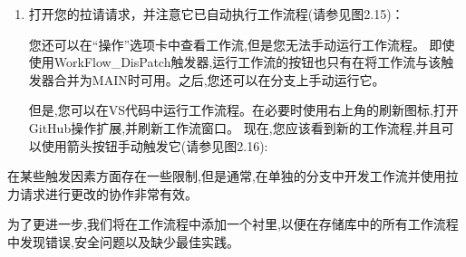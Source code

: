 \begin{enumerate}
\begin{shell}
$ git push -u origin new-workflow
\end{shell}

\item 
接下来,我们将为我们的新分支机构创建拉动请求。当我们使用pull\_request触发器时,这将自动运行我们的新工作流程。转到您的浏览器中的存储库,然后导航以拉出请求。git将检测到您已经推出了一个新分支,并将为您提供创建拉动请求的选项(比较和拉请请求,请参见图2.13):

\myGraphic{0.4}{content/chapter2/images/13.png}{图2.13 --- 在浏览器中创建一个新的pull请求}

只需要保留默认的标题(你之前添加的提交信息)，然后点击Create pull request(见图2.14)：

\myGraphic{0.4}{content/chapter2/images/14.png}{图2.14 --- 创建带有标题和描述的拉取请求}

您还可以使用GitHub CLI创建拉动请求：

\begin{shell}
$ gh pr create --fill
\end{shell}

\begin{myTip}{GitHub CLI}
在整本书中,我们将使用github cli(\url{https://cli.github.com/})。它适用于所有平台和许多包装管理器(Homebrew,Winget,RPM等)。有关更多安装说明,请参见\url{https://github.com/cli/cli/cli#installation}。安装后,您必须使用gh auth login登录(请参阅\url{https://cli.github.com/manual/gh_auth_login})进行身份验证。
\end{myTip}

\item 
打开您的拉请请求，并注意它已自动执行工作流程(请参见图2.15)：


您还可以在“操作”选项卡中查看工作流,但是您无法手动运行工作流程。 即使使用WorkFlow\_DisPatch触发器,运行工作流的按钮也只有在将工作流与该触发器合并为MAIN时可用。之后,您还可以在分支上手动运行它。

但是,您可以在VS代码中运行工作流程。在必要时使用右上角的刷新图标,打开GitHub操作扩展,并刷新工作流窗口。 现在,您应该看到新的工作流程,并且可以使用箭头按钮手动触发它(请参见图2.16):

\end{enumerate}


在某些触发因素方面存在一些限制,但是通常,在单独的分支中开发工作流并使用拉力请求进行更改的协作非常有效。


为了更进一步,我们将在工作流程中添加一个衬里,以便在存储库中的所有工作流程中发现错误,安全问题以及缺少最佳实践。